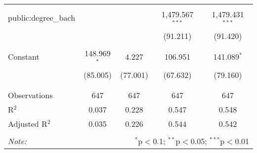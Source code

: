 \begin{table}[H]
\begin{tabular}{@{\extracolsep{5pt}}lcccc}
  & & & & \\ 
 public:degree\_bach &  &  & 1,479.567$^{***}$ & 1,479.431$^{***}$ \\ 
  &  &  & (91.211) & (91.420) \\ 
  & & & & \\ 
 Constant & 148.969$^{*}$ & 4.227 & 106.951 & 141.089$^{*}$ \\ 
  & (85.005) & (77.001) & (67.632) & (79.160) \\ 
  & & & & \\ 
\hline \\[-1.8ex] 
Observations & 647 & 647 & 647 & 647 \\ 
R$^{2}$ & 0.037 & 0.228 & 0.547 & 0.548 \\ 
Adjusted R$^{2}$ & 0.035 & 0.226 & 0.544 & 0.542 \\ 
\hline 
\hline \\[-1.8ex] 
\textit{Note:}  & \multicolumn{4}{r}{$^{*}$p$<$0.1; $^{**}$p$<$0.05; $^{***}$p$<$0.01} \\ 
\end{tabular} 
\end{table} 
